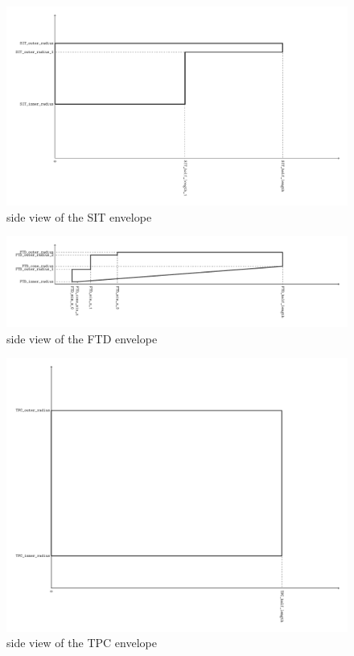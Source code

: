 \documentclass[a4paper]{article}
\begin{document}
\begin{figure}[th]
  \centering
  \includegraphics[width=1.3\columnwidth]{SIT_rz_envelope}
  \caption{side view of the SIT envelope}
  \label{ild:fig:sit_env_rz}
\end{figure}

\begin{figure}[th]
  \centering
  \includegraphics[width=1.3\columnwidth]{FTD_rz_envelope}
  \caption{side view of the FTD envelope}
  \label{ild:fig:ftd_env_rz}
\end{figure}

\begin{figure}[th]
  \centering
  \includegraphics[width=\columnwidth]{TPC_rz_envelope}
  \caption{side view of the TPC envelope}
  \label{ild:fig:tpc_env_rz}
\end{figure}
\end{document}
